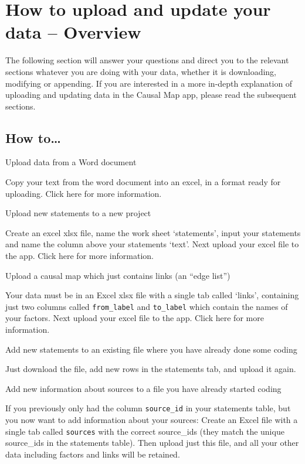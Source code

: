 \documentclass[
]{book}
\begin{document}
\hypertarget{uploadandupdate}{%
\chapter{How to upload and update your data -- Overview}\label{uploadandupdate}}

The following section will answer your questions and direct you to the relevant sections whatever you are doing with your data, whether it is downloading, modifying or appending. If you are interested in a more in-depth explanation of uploading and updating data in the Causal Map app, please read the subsequent sections.

\hypertarget{how-to}{%
\section{How to\ldots{}}\label{how-to}}

Upload data from a Word document

Copy your text from the word document into an excel, in a format ready for uploading. Click here for more information.

Upload new statements to a new project

Create an excel xlsx file, name the work sheet `statements', input your statements and name the column above your statements `text'. Next upload your excel file to the app. Click here for more information.

Upload a causal map which just contains links (an ``edge list'')

Your data must be in an Excel xlsx file with a single tab called `links', containing just two columns called \texttt{from\_label} and \texttt{to\_label} which contain the names of your factors. Next upload your excel file to the app. Click here for more information.

Add new statements to an existing file where you have already done some coding

Just download the file, add new rows in the statements tab, and upload it again.

Add new information about sources to a file you have already started coding

If you previously only had the column \texttt{source\_id} in your statements table, but you now want to add information about your sources: Create an Excel file with a single tab called \texttt{sources} with the correct source\_ids (they match the unique source\_ids in the statements table). Then upload just this file, and all your other data including factors and links will be retained.
\end{document}
